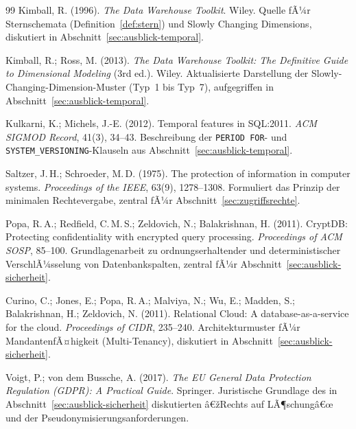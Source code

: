 ﻿\documentclass[a4paper,12pt]{report}
\theoremstyle{definition}
\theoremstyle{remark}
\begin{document}
\begin{thebibliography}{99}
Kimball, R. (1996).
\newblock \emph{The Data Warehouse Toolkit}.
\newblock Wiley.
\newblock Quelle fÃ¼r Sternschemata (Definition~\ref{def:stern}) und
Slowly Changing Dimensions, diskutiert in
Abschnitt~\ref{sec:ausblick-temporal}.

Kimball, R.; Ross, M. (2013).
\newblock \emph{The Data Warehouse Toolkit: The Definitive Guide to
Dimensional Modeling} (3rd ed.).
\newblock Wiley.
\newblock Aktualisierte Darstellung der Slowly-Changing-Dimension-Muster
(Typ~1 bis Typ~7), aufgegriffen in
Abschnitt~\ref{sec:ausblick-temporal}.

Kulkarni, K.; Michels, J.-E. (2012).
\newblock Temporal features in SQL:2011.
\newblock \emph{ACM SIGMOD Record}, 41(3), 34--43.
\newblock Beschreibung der \texttt{PERIOD FOR}- und
\texttt{SYSTEM\_VERSIONING}-Klauseln aus
Abschnitt~\ref{sec:ausblick-temporal}.


Saltzer, J.\,H.; Schroeder, M.\,D. (1975).
\newblock The protection of information in computer systems.
\newblock \emph{Proceedings of the IEEE}, 63(9), 1278--1308.
\newblock Formuliert das Prinzip der minimalen Rechtevergabe,
zentral fÃ¼r Abschnitt~\ref{sec:zugriffsrechte}.

Popa, R.\,A.; Redfield, C.\,M.\,S.; Zeldovich, N.; Balakrishnan, H. (2011).
\newblock CryptDB: Protecting confidentiality with encrypted query processing.
\newblock \emph{Proceedings of ACM SOSP}, 85--100.
\newblock Grundlagenarbeit zu ordnungserhaltender und deterministischer
VerschlÃ¼sselung von Datenbankspalten, zentral fÃ¼r
Abschnitt~\ref{sec:ausblick-sicherheit}.

Curino, C.; Jones, E.; Popa, R.\,A.; Malviya, N.; Wu, E.; Madden, S.;
Balakrishnan, H.; Zeldovich, N. (2011).
\newblock Relational Cloud: A database-as-a-service for the cloud.
\newblock \emph{Proceedings of CIDR}, 235--240.
\newblock Architekturmuster fÃ¼r MandantenfÃ¤higkeit (Multi-Tenancy),
diskutiert in Abschnitt~\ref{sec:ausblick-sicherheit}.

Voigt, P.; von dem Bussche, A. (2017).
\newblock \emph{The EU General Data Protection Regulation (GDPR): A
Practical Guide}.
\newblock Springer.
\newblock Juristische Grundlage des in
Abschnitt~\ref{sec:ausblick-sicherheit} diskutierten
â€žRechts auf LÃ¶schungâ€œ und der Pseudonymisierungsanforderungen.


\end{thebibliography}
\end{document}
